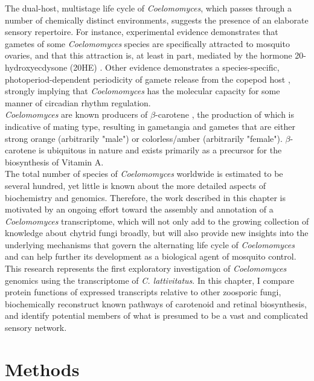 \indent The dual-host, multistage life cycle of \textit{Coelomomyces}, which passes through a number of chemically distinct environments, suggests the presence of an elaborate sensory repertoire. For instance, experimental evidence demonstrates that gametes of some \textit{Coelomomyces} species are specifically attracted to mosquito ovaries, and that this attraction is, at least in part, mediated by the hormone 20-hydroxyecdysone (20HE) \cite{Lucarotti1992}. Other evidence demonstrates a species-specific, photoperiod-dependent periodicity of gamete release from the copepod host \cite{Federici1983}, strongly implying that \textit{Coelomomyces} has the molecular capacity for some manner of circadian rhythm regulation. \\
\indent \textit{Coelomomyces} are known producers of $\beta$-carotene \cite{Federici1979}, the production of which is indicative of mating type, resulting in gametangia and gametes that are either strong orange (arbitrarily "male") or colorless/amber (arbitrarily "female"). $\beta$-carotene is ubiquitous in nature and exists primarily as a precursor for the biosynthesis of Vitamin A.\\
\indent The total number of species of \textit{Coelomomyces} worldwide is estimated to be several hundred, yet little is known about the more detailed aspects of biochemistry and genomics. Therefore, the work described in this chapter is motivated by an ongoing effort toward the assembly and annotation of a \textit{Coelomomyces} transcriptome, which will not only add to the growing collection of knowledge about chytrid fungi broadly, but will also provide new insights into the underlying mechanisms that govern the alternating life cycle of \textit{Coelomomyces} and can help further its development as a biological agent of mosquito control. \\
\indent This research represents the first exploratory investigation of \textit{Coelomomyces} genomics using the transcriptome of \textit{C. lattivitatus}. In this chapter, I compare protein functions of expressed transcripts relative to other zoosporic fungi, biochemically reconstruct known pathways of carotenoid and retinal biosynthesis, and identify potential members of what is presumed to be a vast and complicated sensory network. \\

\section{Methods}

